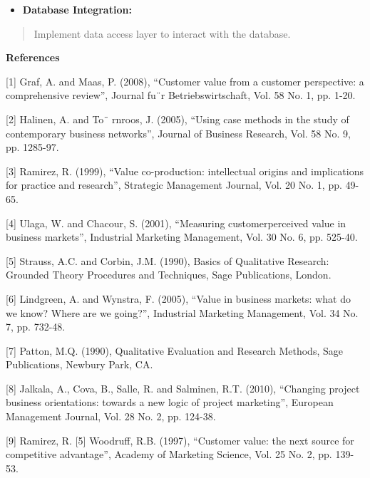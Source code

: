 \documentclass[
]{article}
\begin{document}
\begin{itemize}
\item
  \textbf{Database Integration:}
\end{itemize}

\begin{quote}
Implement data access layer to interact with the database.
\end{quote}

\textbf{References}

{[}1{]} Graf, A. and Maas, P. (2008), ``Customer value from a customer
perspective: a comprehensive review'', Journal fu¨r Betriebswirtschaft,
Vol. 58 No. 1, pp. 1-20.

{[}2{]} Halinen, A. and To¨ rnroos, J. (2005), ``Using case methods in
the study of contemporary business networks'', Journal of Business
Research, Vol. 58 No. 9, pp. 1285-97.

{[}3{]} Ramirez, R. (1999), ``Value co-production: intellectual origins
and implications for practice and research'', Strategic Management
Journal, Vol. 20 No. 1, pp. 49-65.

{[}4{]} Ulaga, W. and Chacour, S. (2001), ``Measuring customerperceived
value in business markets'', Industrial Marketing Management, Vol. 30
No. 6, pp. 525-40.

{[}5{]} Strauss, A.C. and Corbin, J.M. (1990), Basics of Qualitative
Research: Grounded Theory Procedures and Techniques, Sage Publications,
London.

{[}6{]} Lindgreen, A. and Wynstra, F. (2005), ``Value in business
markets: what do we know? Where are we going?'', Industrial Marketing
Management, Vol. 34 No. 7, pp. 732-48.

{[}7{]} Patton, M.Q. (1990), Qualitative Evaluation and Research
Methods, Sage Publications, Newbury Park, CA.

{[}8{]} Jalkala, A., Cova, B., Salle, R. and Salminen, R.T. (2010),
``Changing project business orientations: towards a new logic of project
marketing'', European Management Journal, Vol. 28 No. 2, pp. 124-38.

{[}9{]} Ramirez, R. {[}5{]} Woodruff, R.B. (1997), ``Customer value: the
next source for competitive advantage'', Academy of Marketing Science,
Vol. 25 No. 2, pp. 139-53.
\end{document}
